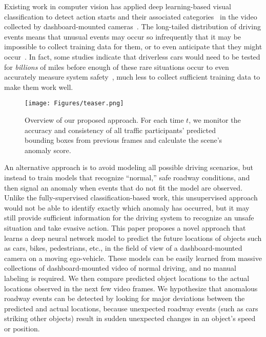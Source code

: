 \documentclass[letterpaper, 10 pt, conference]{ieeeconf}
\theoremstyle{definition}
\theoremstyle{remark}
\begin{document}
Existing work in computer vision has applied deep learning-based visual
classification to detect action starts and their associated
categories~\cite{gao2019startnet} in the video collected by dashboard-mounted
cameras~\cite{chan2016anticipating}. The
long-tailed distribution of driving events means that unusual events
may occur so infrequently that it may be impossible to collect
training data for them, or to even anticipate that
they might occur~\cite{liu2018future}.
In fact, some studies indicate that driverless cars would need to be
tested for \textit{billions} of miles before enough of these rare
situations occur to even accurately measure system
safety~\cite{kalra2016driving}, much less to collect sufficient
training data to make them work well.

\begin{figure}
    \centering
    \texttt{[image: Figures/teaser.png]}
    \caption{
        Overview of our proposed approach. For each time $t$, we monitor
        the accuracy and consistency of all traffic participants'
        predicted bounding boxes from previous frames and
        calculate the scene's anomaly score.
    }
    \vspace{-5pt}
    \label{fig:teaser}
    \vspace{-10pt}
\end{figure}

An alternative approach is to avoid modeling all possible driving
scenarios, but instead to train models that recognize ``normal,''
safe roadway conditions, and then signal an anomaly when events that
do not fit the model are observed.
Unlike the fully-supervised classification-based work, this unsupervised 
approach would not be able to identify exactly which anomaly has occurred,
but it may still provide sufficient information for the driving system to
recognize an unsafe situation and take evasive action.
This paper proposes a novel approach that learns a deep neural
network model to predict the future locations of objects such as
cars, bikes, pedestrians, etc., in the field of view of a
dashboard-mounted camera on a moving ego-vehicle. 
These models can be easily learned from massive collections of dashboard-mounted
video of normal driving, and no manual labeling is required.
We then compare predicted object locations to the actual locations observed in
the next few video frames. We hypothesize that anomalous roadway
events can be detected by looking for major deviations between the
predicted and actual locations, because unexpected roadway events
(such as cars striking other objects) result in sudden
unexpected changes in an object's speed or position.
\end{document}
